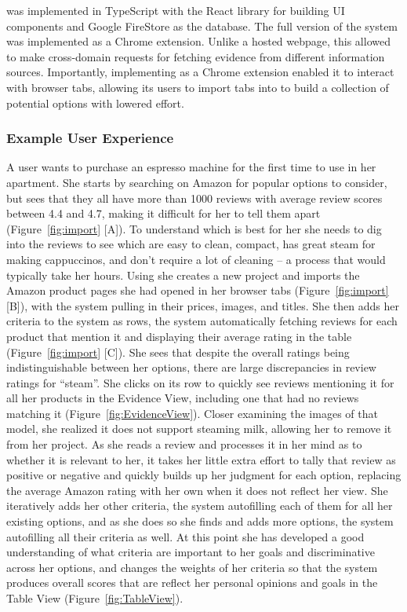 \SYSTEM was implemented in TypeScript with the React library for building UI components and Google FireStore as the database. The full version of the system was implemented as a Chrome extension. Unlike a hosted webpage, this allowed \SYSTEM to make cross-domain requests for fetching evidence from different information sources. Importantly, implementing \SYSTEM as a Chrome extension enabled it to interact with browser tabs, allowing its users to import tabs into \SYSTEM to build a collection of potential options with lowered effort. 



\subsubsection{Example User Experience}

A user wants to purchase an espresso machine for the first time to use in her apartment. She starts by searching on Amazon for popular options to consider, but sees that they all have more than 1000 reviews with average review scores between 4.4 and 4.7, making it difficult for her to tell them apart (Figure~\ref{fig:import} [A]). To understand which is best for her she needs to dig into the reviews to see which are easy to clean, compact, has great steam for making cappuccinos, and don't require a lot of cleaning -- a process that would typically take her hours. Using \SYSTEM she creates a new project and imports the Amazon product pages she had opened in her browser tabs (Figure~\ref{fig:import} [B]), with the system pulling in their prices, images, and titles. She then adds her criteria to the system as rows, the system automatically fetching reviews for each product that mention it and displaying their average rating in the table (Figure~\ref{fig:import} [C]). She sees that despite the overall ratings being indistinguishable between her options, there are large discrepancies in review ratings for ``steam''. She clicks on its row to quickly see reviews mentioning it for all her products in the Evidence View, including one that had no reviews matching it (Figure~\ref{fig:EvidenceView}). Closer examining the images of that model, she realized it does not support steaming milk, allowing her to remove it from her project. As she reads a review and processes it in her mind as to whether it is relevant to her, it takes her little extra effort to tally that review as positive or negative and quickly builds up her judgment for each option, replacing the average Amazon rating with her own when it does not reflect her view. She iteratively adds her other criteria, the system autofilling each of them for all her existing options, and as she does so she finds and adds more options, the system autofilling all their criteria as well. At this point she has developed a good understanding of what criteria are important to her goals and discriminative across her options, and changes the weights of her criteria so that the system produces overall scores that are reflect her personal opinions and goals in the Table View (Figure~\ref{fig:TableView}).


